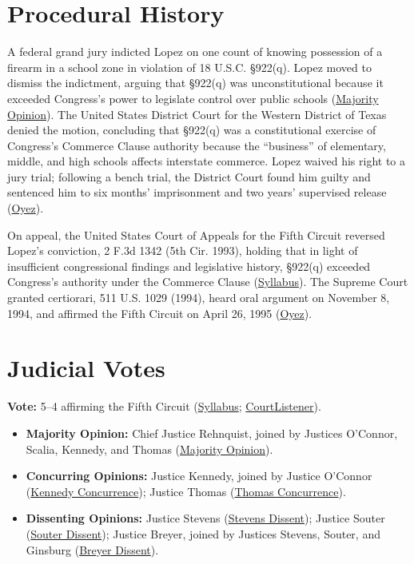 \documentclass[12pt]{article}
\begin{document}
\section{Procedural History}
A federal grand jury indicted Lopez on one count of knowing possession of a firearm in a school zone in violation of 18 U.S.C. \S 922(q). Lopez moved to dismiss the indictment, arguing that \S 922(q) was unconstitutional because it exceeded Congress's power to legislate control over public schools (\href{https://www.law.cornell.edu/supct/html/93-1260.ZO.html}{Majority Opinion}). The United States District Court for the Western District of Texas denied the motion, concluding that \S 922(q) was a constitutional exercise of Congress's Commerce Clause authority because the ``business'' of elementary, middle, and high schools affects interstate commerce. Lopez waived his right to a jury trial; following a bench trial, the District Court found him guilty and sentenced him to six months' imprisonment and two years' supervised release (\href{https://www.oyez.org/cases/1994/93-1260}{Oyez}).

On appeal, the United States Court of Appeals for the Fifth Circuit reversed Lopez's conviction, 2 F.3d 1342 (5th Cir. 1993), holding that in light of insufficient congressional findings and legislative history, \S 922(q) exceeded Congress's authority under the Commerce Clause (\href{https://www.law.cornell.edu/supremecourt/text/93-1260}{Syllabus}). The Supreme Court granted certiorari, 511 U.S. 1029 (1994), heard oral argument on November 8, 1994, and affirmed the Fifth Circuit on April 26, 1995 (\href{https://www.oyez.org/cases/1994/93-1260}{Oyez}).

\section{Judicial Votes}
\textbf{Vote:} 5--4 affirming the Fifth Circuit (\href{https://www.law.cornell.edu/supremecourt/text/93-1260}{Syllabus}; \href{https://www.courtlistener.com/opinion/117927/united-states-v-lopez/}{CourtListener}).
\begin{itemize}
\item \textbf{Majority Opinion:} Chief Justice Rehnquist, joined by Justices O'Connor, Scalia, Kennedy, and Thomas (\href{https://www.law.cornell.edu/supct/html/93-1260.ZO.html}{Majority Opinion}).
\item \textbf{Concurring Opinions:} Justice Kennedy, joined by Justice O'Connor (\href{https://www.law.cornell.edu/supct/html/93-1260.ZC.html}{Kennedy Concurrence}); Justice Thomas (\href{https://www.law.cornell.edu/supct/html/93-1260.ZC1.html}{Thomas Concurrence}).
\item \textbf{Dissenting Opinions:} Justice Stevens (\href{https://www.law.cornell.edu/supct/html/93-1260.ZD.html}{Stevens Dissent}); Justice Souter (\href{https://www.law.cornell.edu/supct/html/93-1260.ZD1.html}{Souter Dissent}); Justice Breyer, joined by Justices Stevens, Souter, and Ginsburg (\href{https://www.law.cornell.edu/supct/html/93-1260.ZD2.html}{Breyer Dissent}).
\end{itemize}
\end{document}
